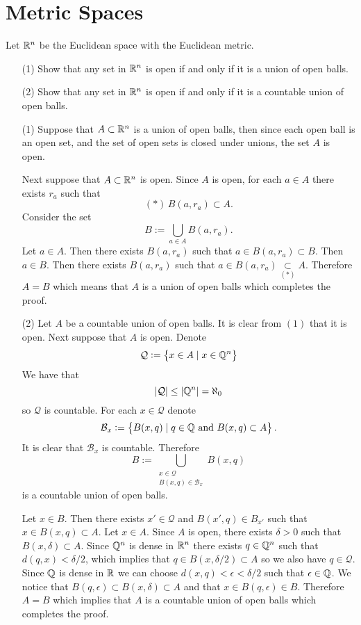 \documentclass[11pt, a4paper]{article}
\begin{document}
\newpage

\section{Metric Spaces}
\begin{exercise}
  Let $\mathbb{R}^n$ be the Euclidean space with the Euclidean metric.
  \begin{enumerate}
    \item[(1)] Show that any set in $\mathbb{R}^n$ is open if and only if it is a union
      of open balls.
    \item[(2)] Show that any set in $\mathbb{R}^n$ is open if and only if it is a
      countable union of open balls.
  \end{enumerate}
\end{exercise}
\begin{solution} \phantom{}
\begin{enumerate}
  \item[(1)] Suppose that $A \subset \mathbb{R}^n$ is a union of open balls, then
    since each open ball is an open set, and the set of open sets is closed
    under unions, the set $A$ is open.

    Next suppose that $A \subset \mathbb{R}^n$ is open.
    Since $A$ is open, for each $a \in A$ there exists $r_a$ such that
    \[
      (*)\,B(a,r_a) \subset A.
    \]
    Consider the set
    \[
      B := \bigcup_{a \in A} B(a,r_a).
    \]
    Let $a \in A$. Then there exists $B(a,r_a)$ such that 
    $a \in B(a,r_a) \subset B$.
    Then $a \in B$. Then there exists $B(a,r_a)$ such that 
    $a \in B(a,r_a) \underset{(*)}{\subset} A$.
    Therefore $A = B$ which means that $A$ is a union of open balls which
    completes the proof.
  \item[(2)] Let $A$ be a countable union of open balls.
    It is clear from $(1)$ that it is open.
    Next suppose that $A$ is open.
    Denote
    \[
      \mathcal Q := \set{x \in A \mid x \in \mathbb{Q}^n}
    \]
    We have that
    \[
      |\mathcal Q| \le |\mathbb{Q}^n| = \aleph_0
    \]
    so $\mathcal Q$ is countable.
    For each $x \in \mathcal Q$ denote
    \[
      \mathcal B_x := \set{B(x,q) \mid q \in \mathbb{Q}\text{ and }B(x,q) \subset A}.
    \]
    It is clear that $\mathcal B_x$ is countable.
    Therefore
    \[
      B :=
      \bigcup_{\substack{x \in \mathcal Q \\ B(x,q) \in \mathcal B_x}} B(x,q)
    \]
    is a countable union of open balls.
    
    Let $x \in B$. Then there exists $x' \in \mathcal Q$ and 
    $B(x',q) \in B_{x'}$ such that $x \in B(x,q) \subset A$.
    Let $x \in A$. Since $A$ is open, there exists $\delta > 0$ such that 
    $B(x,\delta) \subset A$.
    Since $\mathbb{Q}^n$ is dense in $\mathbb{R}^n$ there exists $q \in \mathbb{Q}^n$ such that
    $d(q,x) < \delta / 2$, which implies that $q \in B(x,\delta / 2) \subset A$
    so we also have $q \in \mathcal Q$.
    Since $\mathbb{Q}$ is dense in $\mathbb{R}$ we can
    choose $d(x,q) < \epsilon < \delta / 2$ such that $\epsilon \in \mathbb{Q}$.
    We notice that $B(q,\epsilon) \subset B(x,\delta) \subset A$ and that
    $x \in B(q, \epsilon) \in B$.
    Therefore $A = B$ which implies that $A$ is a countable union of open balls 
    which completes the proof.
\end{enumerate}
\end{solution}
\end{document}
